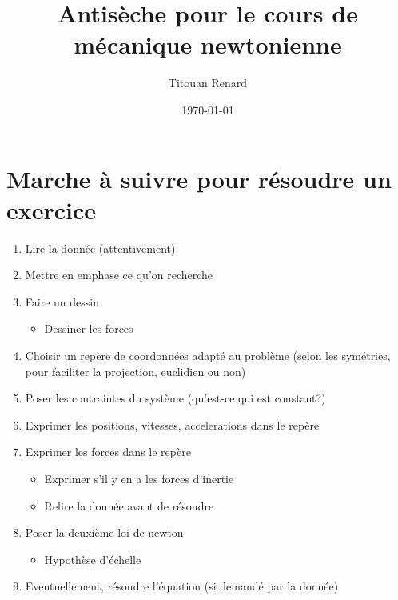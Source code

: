 \documentclass[11pt]{article}
\title{Antisèche pour le cours de mécanique newtonienne}
\date{\today}
\author{Titouan Renard}
\begin{document}
\maketitle	


\section{Marche à suivre pour résoudre un exercice}

\begin{enumerate}
    \item Lire la donnée (attentivement)
    \item Mettre en emphase ce qu'on recherche
    \item Faire un dessin
    \begin{itemize}
        \item Dessiner les forces
    \end{itemize}
    \item Choisir un repère de coordonnées adapté au problème (selon les symétries, pour faciliter la projection, euclidien ou non)
    \item Poser les contraintes du système (qu'est-ce qui est constant?)
    \item Exprimer les positions, vitesses, accelerations dans le repère
    \item Exprimer les forces dans le repère
    \begin{itemize}
        \item Exprimer s'il y en a les forces d'inertie
        \item Relire la donnée avant de résoudre
    \end{itemize}
    \item Poser la deuxième loi de newton
    \begin{itemize}
        \item Hypothèse d'échelle
    \end{itemize}
    \item Eventuellement, résoudre l'équation (si demandé par la donnée)
\end{enumerate}
\end{document}
